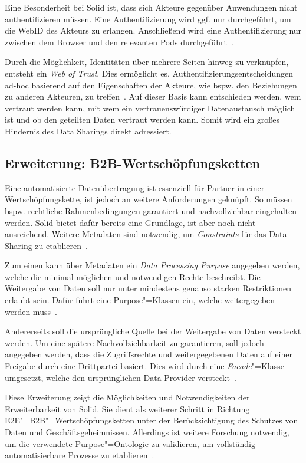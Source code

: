 Eine Besonderheit bei Solid ist, dass sich Akteure gegenüber Anwendungen nicht authentifizieren müssen.
Eine Authentifizierung wird ggf. nur durchgeführt, um die WebID des Akteurs zu erlangen.
Anschließend wird eine Authentifizierung nur zwischen dem Browser und den relevanten Pods durchgeführt~\cite{sambraSolidPlatformDecentralized2016}.

Durch die Möglichkeit, Identitäten über mehrere Seiten hinweg zu verknüpfen, entsteht ein \emph{Web of Trust}.
Dies ermöglicht es, Authentifizierungsentscheidungen ad-hoc basierend auf den Eigenschaften der Akteure, wie bspw. den Beziehungen zu anderen Akteuren, zu treffen~\cite{sambraSolidPlatformDecentralized2016}.
Auf dieser Basis kann entschieden werden, wem vertraut werden kann, mit wem ein vertrauenswürdiger Datenaustausch möglich ist und ob den geteilten Daten vertraut werden kann.
Somit wird ein großes Hindernis des Data Sharings direkt adressiert.


\subsection{Erweiterung: B2B-Wertschöpfungsketten}

Eine automatisierte Datenübertragung ist essenziell für Partner in einer Wertschöpfungskette, ist jedoch an weitere Anforderungen geknüpft.
So müssen bspw. rechtliche Rahmenbedingungen garantiert und nachvollziehbar eingehalten werden.
Solid bietet dafür bereits eine Grundlage, ist aber noch nicht ausreichend.
Weitere Metadaten sind notwendig, um \emph{Constraints} für das Data Sharing zu etablieren~\cite{bothSolidBasedB2BData2025}.

Zum einen kann über Metadaten ein \emph{Data Processing Purpose} angegeben werden, welche die minimal möglichen und notwendigen Rechte beschreibt.
Die Weitergabe von Daten soll nur unter mindestens genauso starken Restriktionen erlaubt sein.
Dafür führt \cite{bothSolidBasedB2BData2025} eine Purpose"=Klassen ein, welche weitergegeben werden muss~\cite{bothSolidBasedB2BData2025}.

Andererseits soll die ursprüngliche Quelle bei der Weitergabe von Daten versteckt werden.
Um eine spätere Nachvollziehbarkeit zu garantieren, soll jedoch angegeben werden, dass die Zugriffsrechte und weitergegebenen Daten auf einer Freigabe durch eine Drittpartei basiert.
Dies wird durch eine \emph{Facade}"=Klasse umgesetzt, welche den ursprünglichen Data Provider versteckt~\cite{bothSolidBasedB2BData2025}.

Diese Erweiterung zeigt die Möglichkeiten und Notwendigkeiten der Erweiterbarkeit von Solid.
Sie dient als weiterer Schritt in Richtung E2E"=B2B"=Wertschöpfungsketten unter der Berücksichtigung des Schutzes von Daten und Geschäftsgeheimnissen.
Allerdings ist weitere Forschung notwendig, um die verwendete Purpose"=Ontologie zu validieren, um vollständig automatisierbare Prozesse zu etablieren~\cite{bothSolidBasedB2BData2025}.

